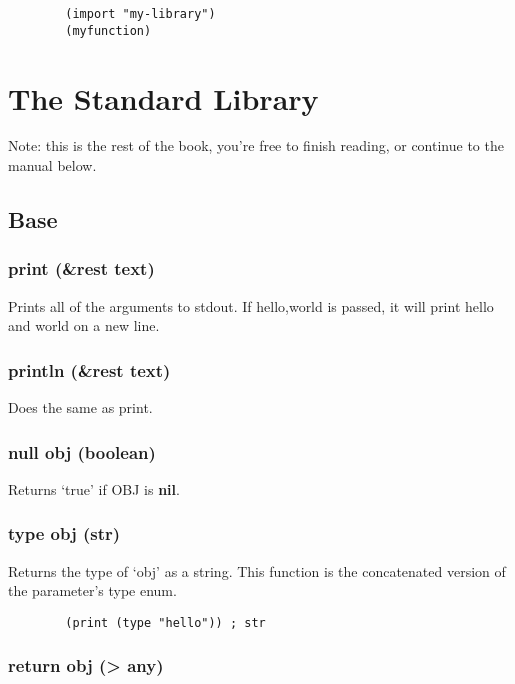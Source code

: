 \documentclass{article}
\begin{document}
	\begin{lstlisting}
		(import "my-library")
		(myfunction)
	\end{lstlisting}

	\section{The Standard Library}
	
	Note: this is the rest of the book, you're free to finish reading, or continue to the manual below.
	
	\subsection{Base}
	
	\subsubsection{print (\&rest text)}

	Prints all of the arguments to stdout. If {hello,world} is passed, it will print hello and world on a new line.
	
	\subsubsection{println (\&rest text)}
	
	Does the same as print.
	
	\subsubsection{null obj (boolean)}
	
	Returns `true' if OBJ is \textbf{nil}.
	
	\subsubsection{type obj (str)}
	
	Returns the type of `obj' as a string. This function is the concatenated version of the parameter's type enum.
	
	\begin{lstlisting}
		(print (type "hello")) ; str
	\end{lstlisting}

	\subsubsection{return obj (> any)}
	
\end{document}
